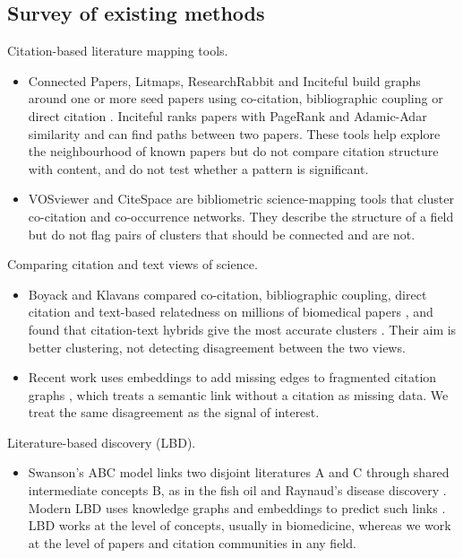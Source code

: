 \documentclass[11pt,a4paper]{article}
\begin{document}
\subsection{Survey of existing methods}

Citation-based literature mapping tools.
\begin{itemize}
  \item Connected Papers, Litmaps, ResearchRabbit and Inciteful build graphs around one or more seed papers using co-citation, bibliographic coupling or direct citation \cite{tay2022tools}. Inciteful ranks papers with PageRank and Adamic-Adar similarity and can find paths between two papers. These tools help explore the neighbourhood of known papers but do not compare citation structure with content, and do not test whether a pattern is significant.
  \item VOSviewer \cite{vaneck2010vosviewer} and CiteSpace \cite{chen2006citespace} are bibliometric science-mapping tools that cluster co-citation and co-occurrence networks. They describe the structure of a field but do not flag pairs of clusters that should be connected and are not.
\end{itemize}

Comparing citation and text views of science.
\begin{itemize}
  \item Boyack and Klavans compared co-citation, bibliographic coupling, direct citation and text-based relatedness on millions of biomedical papers \cite{boyack2010citation}, and found that citation-text hybrids give the most accurate clusters \cite{boyack2020hybrid}. Their aim is better clustering, not detecting disagreement between the two views.
  \item Recent work uses embeddings to add missing edges to fragmented citation graphs \cite{semaug2026}, which treats a semantic link without a citation as missing data. We treat the same disagreement as the signal of interest.
\end{itemize}

Literature-based discovery (LBD).
\begin{itemize}
  \item Swanson's ABC model links two disjoint literatures A and C through shared intermediate concepts B, as in the fish oil and Raynaud's disease discovery \cite{swanson1986fish}. Modern LBD uses knowledge graphs and embeddings to predict such links \cite{lbdsurvey2025}. LBD works at the level of concepts, usually in biomedicine, whereas we work at the level of papers and citation communities in any field.
\end{itemize}
\end{document}
